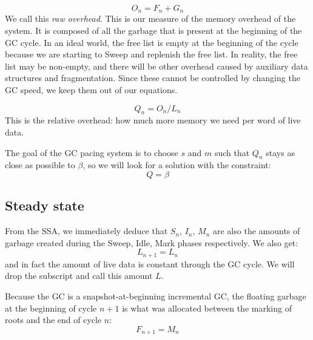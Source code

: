 \documentclass{article}
\begin{document}
\begin{equation}\label{def-O}
O_n = F_n + G_n
\end{equation}
We call this \emph{raw overhead}. This is our measure of the memory
overhead of the system. It is
composed of all the garbage that is present at the  beginning of the
GC cycle. In an ideal world, the free list is empty at the beginning
of the cycle because we are starting to Sweep and replenish the free
list. In reality, the free list may be non-empty, and there will be
other overhead caused by auxiliary data structures and
fragmentation. Since these cannot be controlled by changing the GC
speed, we keep them out of our equations.


\begin{equation}\label{def-Q}
Q_n = O_n/L_n
\end{equation}
This is the relative overhead: how much more memory we need per word
of live data.

The goal of the GC pacing system is to choose $s$ and $m$ such that
$Q_n$ stays as close as possible to $\beta$, so we will look for a
solution with the constraint:
\begin{equation}\label{beta-Q}
Q = \beta
\end{equation}

\subsection{Steady state}

From the SSA, we immediately deduce that $S_n$, $I_n$, $M_n$ are also
the amounts of garbage created during the Sweep, Idle, Mark phases
respectively. We also get:
\begin{equation}
  L_{n+1} = L_n
\end{equation}
and in fact the amount of live data is constant through the GC
cycle. We will drop the subscript and call this amount $L$.

Because the GC is a snapshot-at-beginning incremental GC, the floating
garbage at the beginning of cycle $n+1$ is what was allocated between
the marking of roots and the end of cycle $n$:
\begin{equation}\label{eqn-F}
  F_{n+1} = M_n
\end{equation}
\end{document}
